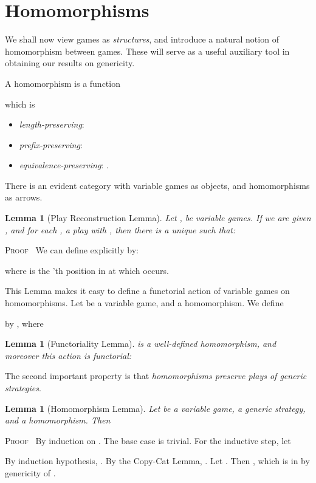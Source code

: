 \documentclass[a4paper,11pt]{article}
\newtheorem{lemma}[proposition]{Lemma}
\newenvironment{proof}{\textsc{Proof}\ }{}
\begin{document}
\section{Homomorphisms}
We shall now view games as \emph{structures}, and introduce a natural
notion of homomorphism between games. These will serve as a useful
auxiliary tool in obtaining our results on genericity.

A homomorphism  is a function

which is
\begin{itemize}
\item \emph{length-preserving}: 
\item \emph{prefix-preserving}: 
\item \emph{equivalence-preserving}: .
\end{itemize}

There is an evident category  with  variable games as objects, and
homomorphisms as arrows.

\begin{lemma}[Play Reconstruction Lemma]
Let ,  be variable games. If we are given ,
and for each , a play  with ,
then there is a unique  such
  that:

\end{lemma}
\begin{proof}
We can define  explicitly by:

where  is the 'th position in  at which  occurs.
\end{proof}

This Lemma makes it easy to define a functorial action of variable
games on homomorphisms. Let   be a variable game, and  a homomorphism.
We define

by
,
where


\begin{lemma}[Functoriality Lemma]
 is a well-defined homomorphism, and moreover this action is
functorial:

\end{lemma}

\noindent The second important property is that \emph{homomorphisms preserve plays of
generic strategies}.

\begin{lemma}[Homomorphism Lemma]
Let  be a variable game,   a generic strategy, and  a homomorphism. Then

\end{lemma}
\begin{proof}
By induction on . The base case is trivial. For the inductive
step, let

By induction hypothesis, .
By the Copy-Cat Lemma, . Let . Then
, which is in
 by genericity of .
\end{proof}
\end{document}
